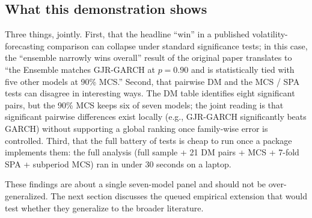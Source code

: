 \subsection{What this demonstration shows}

Three things, jointly. First, that the headline ``win'' in a published volatility-forecasting comparison can collapse under standard significance tests; in this case, the ``ensemble narrowly wins overall'' result of the original paper translates to ``the Ensemble matches GJR-GARCH at $p = 0.90$ and is statistically tied with five other models at 90\% MCS.'' Second, that pairwise DM and the MCS / SPA tests can disagree in interesting ways. The DM table identifies eight significant pairs, but the 90\% MCS keeps six of seven models; the joint reading is that significant pairwise differences exist locally (e.g., GJR-GARCH significantly beats GARCH) without supporting a global ranking once family-wise error is controlled. Third, that the full battery of tests is cheap to run once a package implements them: the full  analysis (full sample + 21 DM pairs + MCS + 7-fold SPA + subperiod MCS) ran in under 30 seconds on a laptop.

These findings are about a single seven-model panel and should not be over-generalized. The next section discusses the queued empirical extension that would test whether they generalize to the broader literature.
